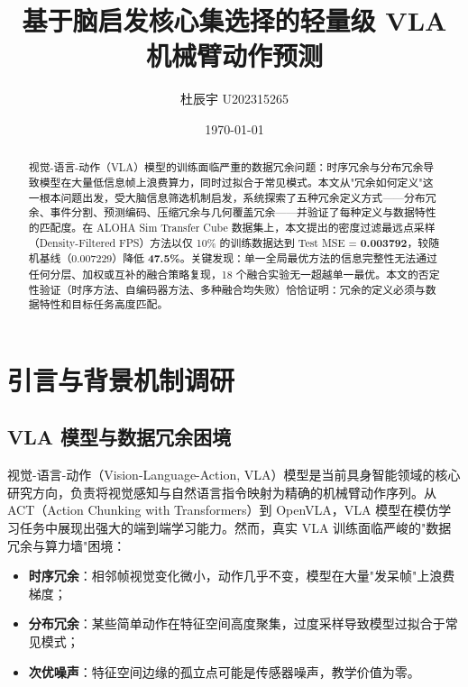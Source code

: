\documentclass[12pt,a4paper]{article}
\title{\textbf{基于脑启发核心集选择的轻量级 VLA 机械臂动作预测}}
\author{杜辰宇 \hspace{2cm} U202315265}
\date{\today}
\begin{document}
\maketitle
\thispagestyle{empty}

\begin{abstract}
视觉-语言-动作（VLA）模型的训练面临严重的数据冗余问题：时序冗余与分布冗余导致模型在大量低信息帧上浪费算力，同时过拟合于常见模式。本文从"冗余如何定义"这一根本问题出发，受大脑信息筛选机制启发，系统探索了五种冗余定义方式——分布冗余、事件分割、预测编码、压缩冗余与几何覆盖冗余——并验证了每种定义与数据特性的匹配度。在 ALOHA Sim Transfer Cube 数据集上，本文提出的密度过滤最远点采样（Density-Filtered FPS）方法以仅 10\% 的训练数据达到 Test MSE = \textbf{0.003792}，较随机基线（0.007229）降低 \textbf{47.5\%}。关键发现：单一全局最优方法的信息完整性无法通过任何分层、加权或互补的融合策略复现，18 个融合实验无一超越单一最优。本文的否定性验证（时序方法、自编码器方法、多种融合均失败）恰恰证明：冗余的定义必须与数据特性和目标任务高度匹配。
\end{abstract}

\newpage
\tableofcontents
\newpage

\section{引言与背景机制调研}
\label{sec:intro}

\subsection{VLA 模型与数据冗余困境}

视觉-语言-动作（Vision-Language-Action, VLA）模型是当前具身智能领域的核心研究方向，负责将视觉感知与自然语言指令映射为精确的机械臂动作序列\cite{zhao2023act}。从 ACT（Action Chunking with Transformers）到 OpenVLA\cite{kim2024openvla}，VLA 模型在模仿学习任务中展现出强大的端到端学习能力。然而，真实 VLA 训练面临严峻的"数据冗余与算力墙"困境：

\begin{itemize}[leftmargin=2em]
    \item \textbf{时序冗余}：相邻帧视觉变化微小，动作几乎不变，模型在大量"发呆帧"上浪费梯度；
    \item \textbf{分布冗余}：某些简单动作在特征空间高度聚集，过度采样导致模型过拟合于常见模式；
    \item \textbf{次优噪声}：特征空间边缘的孤立点可能是传感器噪声，教学价值为零。
\end{itemize}
\end{document}
